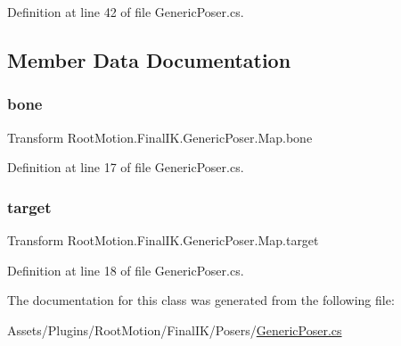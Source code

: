 Definition at line 42 of file Generic\+Poser.\+cs.



\subsection{Member Data Documentation}
\mbox{\label{class_root_motion_1_1_final_i_k_1_1_generic_poser_1_1_map_aa440fa328fe60e698b6cf7a632dca63e}} 
\subsubsection{\texorpdfstring{bone}{bone}}
{\footnotesize\ttfamily Transform Root\+Motion.\+Final\+I\+K.\+Generic\+Poser.\+Map.\+bone}



Definition at line 17 of file Generic\+Poser.\+cs.

\mbox{\label{class_root_motion_1_1_final_i_k_1_1_generic_poser_1_1_map_acfca6df931850f706e9c7dc2139cc50c}} 
\subsubsection{\texorpdfstring{target}{target}}
{\footnotesize\ttfamily Transform Root\+Motion.\+Final\+I\+K.\+Generic\+Poser.\+Map.\+target}



Definition at line 18 of file Generic\+Poser.\+cs.



The documentation for this class was generated from the following file\+:\begin{DoxyCompactItemize}
\item 
Assets/\+Plugins/\+Root\+Motion/\+Final\+I\+K/\+Posers/\mbox{\hyperlink{_generic_poser_8cs}{Generic\+Poser.\+cs}}\end{DoxyCompactItemize}
